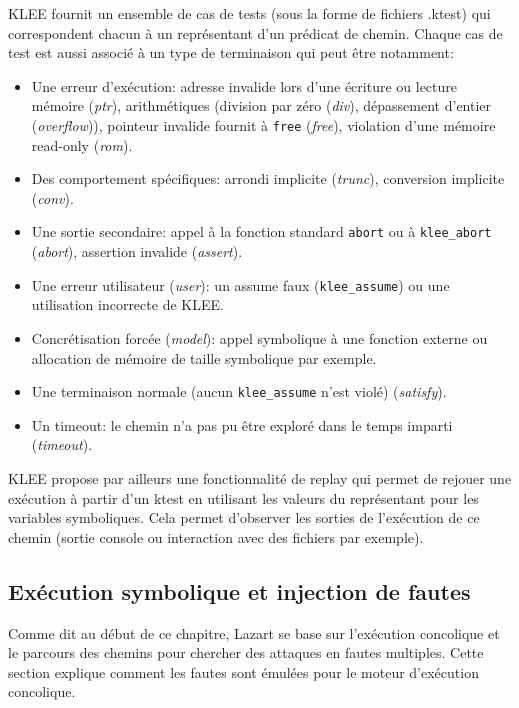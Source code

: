             KLEE fournit un ensemble de cas de tests (sous la forme de fichiers .ktest) qui correspondent chacun à un représentant d'un prédicat de chemin. Chaque cas de test est aussi associé à un type de terminaison qui peut être notamment:
            \begin{itemize}
                \item Une erreur d'exécution: adresse invalide lors d'une écriture ou lecture mémoire (\textit{ptr}), arithmétiques (division par zéro (\textit{div}), dépassement d'entier (\textit{overflow})), pointeur invalide fournit à \texttt{free} (\textit{free}), violation d'une mémoire read-only (\textit{rom}).
                \item Des comportement spécifiques: arrondi implicite (\textit{trunc}), conversion implicite (\textit{conv}).
                \item Une sortie secondaire: appel à la fonction standard \texttt{abort} ou à \texttt{klee\_abort} (\textit{abort}), assertion invalide (\textit{assert}). 
                \item Une erreur utilisateur (\textit{user}): un assume faux (\texttt{klee\_assume}) ou une utilisation incorrecte de KLEE.
                \item Concrétisation forcée (\textit{model}): appel symbolique à une fonction externe ou allocation de mémoire de taille symbolique par exemple.
                \item Une terminaison normale (aucun \texttt{klee\_assume} n'est violé) (\textit{satisfy}). 
                \item Un timeout: le chemin n'a pas pu être exploré dans le temps imparti (\textit{timeout}). 
            \end{itemize}            
            
            KLEE propose par ailleurs une fonctionnalité de replay qui permet de rejouer une exécution à partir d'un ktest en utilisant les valeurs du représentant pour les variables symboliques. Cela permet d'observer les sorties de l'exécution de ce chemin (sortie console ou interaction avec des fichiers par exemple).
            
        \subsection{Exécution symbolique et injection de fautes}
        \label{sec:dse-fi}
        
            Comme dit au début de ce chapitre, Lazart se base sur l'exécution concolique et le parcours des chemins pour chercher des attaques en fautes multiples. Cette section explique comment les fautes sont émulées pour le moteur d'exécution concolique.
        
